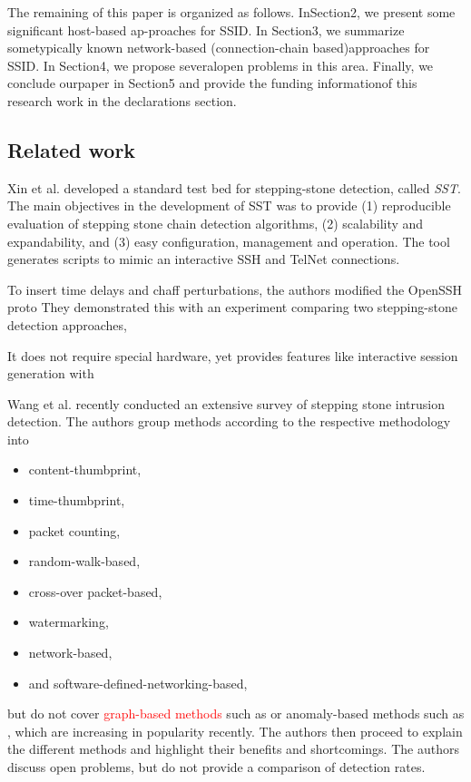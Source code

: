 \documentclass[conference]{IEEEtran}\usepackage[]{graphicx}\usepackage[]{color}
\begin{document}
The remaining of this paper is organized as follows. InSection2, we present some significant host-based ap-proaches for SSID. In Section3, we summarize sometypically known network-based (connection-chain based)approaches for SSID. In Section4, we propose severalopen problems in this area. Finally, we conclude ourpaper in Section5 and provide the funding informationof this research work in the declarations section.

\subsection{Related work}\label{Sec:Relatedwork}

Xin et al. \cite{xin2006testbed} developed a standard test bed for stepping-stone detection, called \textit{SST}. 
The main objectives in the development of SST was to provide (1) reproducible evaluation of stepping stone chain detection algorithms, (2) scalability and expandability, and (3) easy configuration, management and operation. The  tool generates scripts to mimic an interactive SSH and TelNet connections. 

To insert time delays and chaff perturbations, the authors modified the OpenSSH proto
They   demonstrated this with   an experiment   comparing   two stepping-stone   detection   approaches,


It does not require special hardware, yet provides features like interactive session generation with  

Wang et al. \cite{wang2018research} recently conducted an extensive survey of  stepping stone intrusion detection. The authors group methods according to the respective methodology into 
\begin{itemize}
\item content-thumbprint,
\item time-thumbprint,
\item packet counting,
\item random-walk-based,
\item cross-over packet-based,
\item watermarking,
\item network-based,
\item and software-defined-networking-based, 
\end{itemize} 
but do not cover \textcolor{red}{graph-based methods} such as \cite{gamarra2018analysis} %
or anomaly-based methods such as \cite{di2011detecting}, which are increasing in popularity recently.
The authors then proceed to explain the different methods and highlight their benefits and shortcomings. The authors discuss open problems, but do not provide a comparison of detection rates. 
\end{document}
